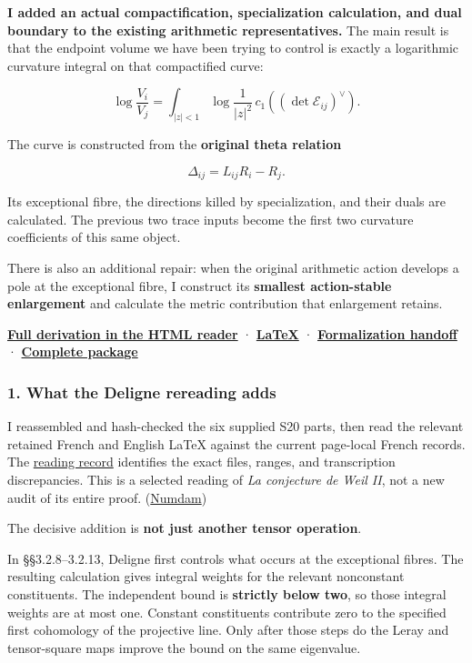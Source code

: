 \textbf{I added an actual compactification, specialization calculation, and dual boundary to the existing arithmetic representatives.} The main result is that the endpoint volume we have been trying to control is exactly a logarithmic curvature integral on that compactified curve:

\[
\boxed{
\log\frac{V_i}{V_j}
=
\int_{|z|<1}
\log\frac1{|z|^2}\,
c_1\!\left((\det\mathscr E_{ij})^\vee\right).
}
\]

The curve is constructed from the \textbf{original theta relation}

\[
\Delta_{ij}=L_{ij}R_i-R_j.
\]

Its exceptional fibre, the directions killed by specialization, and their duals are calculated. The previous two trace inputs become the first two curvature coefficients of this same object.

There is also an additional repair: when the original arithmetic action develops a pole at the exceptional fibre, I construct its \textbf{smallest action-stable enlargement} and calculate the metric contribution that enlargement retains.

\href{sources/endpoint_user_sources/HISTORICAL_DOWNLOAD_LINKS.md}{\textbf{Full derivation in the HTML reader}} · \href{sources/endpoint_user_sources/HISTORICAL_DOWNLOAD_LINKS.md}{\textbf{LaTeX}} · \href{sources/endpoint_user_sources/HISTORICAL_DOWNLOAD_LINKS.md}{\textbf{Formalization handoff}} · \href{sources/endpoint_user_sources/HISTORICAL_DOWNLOAD_LINKS.md}{\textbf{Complete package}}

\subsubsection{1. What the Deligne rereading adds}\label{endpoint-curvature_original--what-the-deligne-rereading-adds}

I reassembled and hash-checked the six supplied S20 parts, then read the relevant retained French and English LaTeX against the current page-local French records. The \href{sources/endpoint_user_sources/HISTORICAL_DOWNLOAD_LINKS.md}{reading record} identifies the exact files, ranges, and transcription discrepancies. This is a selected reading of \emph{La conjecture de Weil II}, not a new audit of its entire proof. (\href{https://www.numdam.org/item/PMIHES_1980__52__137_0/}{Numdam})

The decisive addition is \textbf{not just another tensor operation}.

In §§3.2.8--3.2.13, Deligne first controls what occurs at the exceptional fibres. The resulting calculation gives integral weights for the relevant nonconstant constituents. The independent bound is \textbf{strictly below two}, so those integral weights are at most one. Constant constituents contribute zero to the specified first cohomology of the projective line. Only after those steps do the Leray and tensor-square maps improve the bound on the same eigenvalue.

